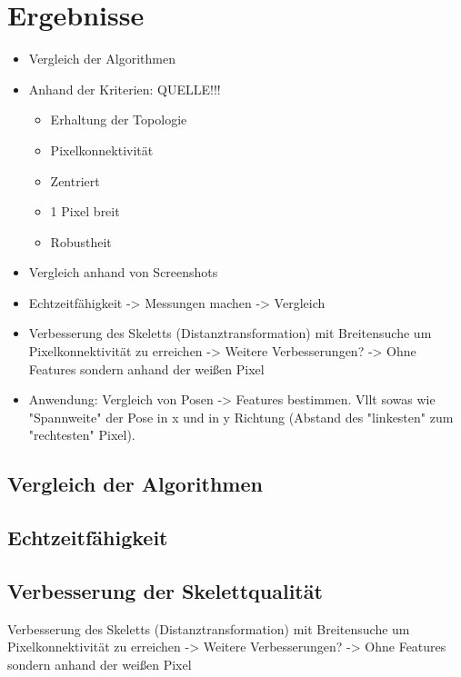 \chapter{Ergebnisse}
\begin{itemize}
	\item Vergleich der Algorithmen
	\item Anhand der Kriterien: QUELLE!!!
	\begin{itemize}
		\item Erhaltung der Topologie
		\item Pixelkonnektivität
		\item Zentriert
		\item 1 Pixel breit
		\item Robustheit
	\end{itemize}
	\item Vergleich anhand von Screenshots
	\item Echtzeitfähigkeit -> Messungen machen -> Vergleich
	\item Verbesserung des Skeletts (Distanztransformation) mit Breitensuche um Pixelkonnektivität zu erreichen -> Weitere Verbesserungen? -> Ohne Features sondern anhand der weißen Pixel
	\item Anwendung: Vergleich von Posen -> Features bestimmen. Vllt sowas wie "Spannweite" der Pose in x und in y Richtung (Abstand des "linkesten" zum "rechtesten" Pixel). 
\end{itemize}
\section{Vergleich der Algorithmen}
\section{Echtzeitfähigkeit}
\section{Verbesserung der Skelettqualität}
Verbesserung des Skeletts (Distanztransformation) mit Breitensuche um Pixelkonnektivität zu erreichen -> Weitere Verbesserungen? -> Ohne Features sondern anhand der weißen Pixel
